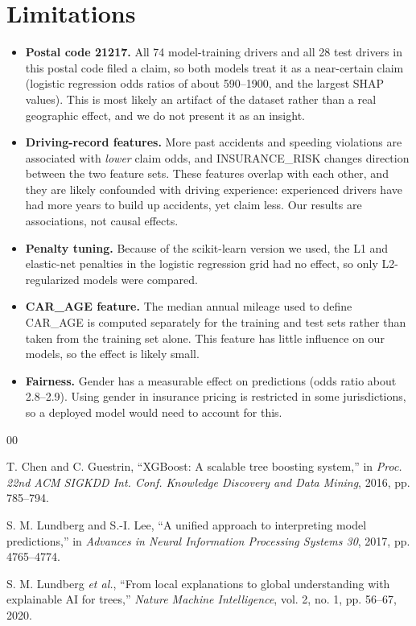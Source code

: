 \documentclass[conference]{IEEEtran}
\begin{document}
\section{Limitations}
\begin{itemize}
\item \textbf{Postal code 21217.} All 74 model-training drivers and all 28 test drivers in this postal code filed a claim, so both models treat it as a near-certain claim (logistic regression odds ratios of about 590--\num{1900}, and the largest SHAP values). This is most likely an artifact of the dataset rather than a real geographic effect, and we do not present it as an insight.
\item \textbf{Driving-record features.} More past accidents and speeding violations are associated with \emph{lower} claim odds, and INSURANCE\_RISK changes direction between the two feature sets. These features overlap with each other, and they are likely confounded with driving experience: experienced drivers have had more years to build up accidents, yet claim less. Our results are associations, not causal effects.
\item \textbf{Penalty tuning.} Because of the scikit-learn version we used, the L1 and elastic-net penalties in the logistic regression grid had no effect, so only L2-regularized models were compared.
\item \textbf{CAR\_AGE feature.} The median annual mileage used to define CAR\_AGE is computed separately for the training and test sets rather than taken from the training set alone. This feature has little influence on our models, so the effect is likely small.
\item \textbf{Fairness.} Gender has a measurable effect on predictions (odds ratio about 2.8--2.9). Using gender in insurance pricing is restricted in some jurisdictions, so a deployed model would need to account for this.
\end{itemize}


\begin{thebibliography}{00}

T. Chen and C. Guestrin,
``XGBoost: A scalable tree boosting system,''
in \textit{Proc. 22nd ACM SIGKDD Int. Conf. Knowledge Discovery and Data Mining},
2016, pp. 785--794.

S. M. Lundberg and S.-I. Lee,
``A unified approach to interpreting model predictions,''
in \textit{Advances in Neural Information Processing Systems 30},
2017, pp. 4765--4774.

S. M. Lundberg \textit{et al.},
``From local explanations to global understanding with explainable AI for trees,''
\textit{Nature Machine Intelligence},
vol. 2, no. 1, pp. 56--67, 2020.

\end{thebibliography}
\end{document}
